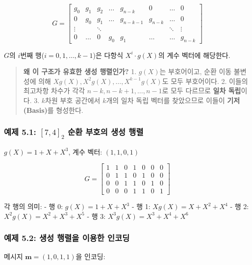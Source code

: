 \documentclass[
  oneside]{article}
\begin{document}
\[G = \begin{bmatrix}
g_0 & g_1 & g_2 & \dots & g_{n-k} & 0 & \dots & 0 \\
0 & g_0 & g_1 & \dots & g_{n-k-1} & g_{n-k} & \dots & 0 \\
\vdots & & \ddots & & & & \ddots & \vdots \\
0 & \dots & 0 & g_0 & g_1 & \dots & \dots & g_{n-k}
\end{bmatrix}\]

\(G\)의 \(i\)번째 행(\(i = 0, 1, \dots, k-1\))은 다항식
\(X^i \cdot g(X)\)의 계수 벡터에 해당한다.

\begin{quote}
\textbf{왜 이 구조가 유효한 생성 행렬인가?} 1. \(g(X)\)는 부호어이고,
순환 이동 불변성에 의해 \(Xg(X), X^2g(X), \dots, X^{k-1}g(X)\)도 모두
부호어이다. 2. 이들의 최고차항 차수가 각각 \(n-k, n-k+1, \dots, n-1\)로
모두 다르므로 \textbf{일차 독립}이다. 3. \(k\)차원 부호 공간에서
\(k\)개의 일차 독립 벡터를 찾았으므로 이들이 \textbf{기저(Basis)}를
형성한다.
\end{quote}

\subsubsection{\texorpdfstring{예제 5.1: \([7, 4]_2\) 순환 부호의 생성
행렬}{예제 5.1: {[}7, 4{]}\_2 순환 부호의 생성 행렬}}\label{uxc608uxc81c-5.1-7-4_2-uxc21cuxd658-uxbd80uxd638uxc758-uxc0dduxc131-uxd589uxb82c}

\(g(X) = 1 + X + X^3\), 계수 벡터: \((1, 1, 0, 1)\)

\[G = \begin{bmatrix}
1 & 1 & 0 & 1 & 0 & 0 & 0 \\
0 & 1 & 1 & 0 & 1 & 0 & 0 \\
0 & 0 & 1 & 1 & 0 & 1 & 0 \\
0 & 0 & 0 & 1 & 1 & 0 & 1
\end{bmatrix}\]

각 행의 의미: - 행 0: \(g(X) = 1 + X + X^3\) - 행 1:
\(Xg(X) = X + X^2 + X^4\) - 행 2: \(X^2g(X) = X^2 + X^3 + X^5\) - 행 3:
\(X^3g(X) = X^3 + X^4 + X^6\)

\subsubsection{예제 5.2: 생성 행렬을 이용한
인코딩}\label{uxc608uxc81c-5.2-uxc0dduxc131-uxd589uxb82cuxc744-uxc774uxc6a9uxd55c-uxc778uxcf54uxb529}

메시지 \(\mathbf{m} = (1, 0, 1, 1)\)을 인코딩:
\end{document}
